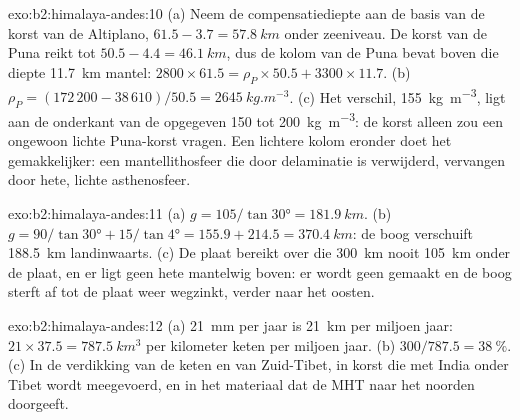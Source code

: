 \begin{solution}{exo:b2:himalaya-andes:10}
(a) Neem de compensatiediepte aan de basis van de korst van de Altiplano, $61.5 - 3.7 =
\qty{57.8}{km}$ onder zeeniveau. De korst van de Puna reikt tot $50.5 - 4.4 = \qty{46.1}{km}$, dus de
kolom van de Puna bevat boven die diepte \qty{11.7}{km} mantel: $2800\times61.5 =
\rho_P\times50.5 + 3300\times11.7$. (b) $\rho_P = (172\,200 - 38\,610)/50.5 =
\qty{2645}{kg.m^{-3}}$. (c) Het verschil, \qty{155}{kg.m^{-3}}, ligt aan de onderkant van
de opgegeven 150 tot \qty{200}{kg.m^{-3}}: de korst alleen zou een ongewoon lichte Puna-korst vragen.
Een lichtere kolom eronder doet het gemakkelijker: een mantellithosfeer die door delaminatie is verwijderd,
vervangen door hete, lichte asthenosfeer.
\end{solution}

\begin{solution}{exo:b2:himalaya-andes:11}
(a) $g = 105/\tan\ang{30} = \qty{181.9}{km}$. (b) $g = 90/\tan\ang{30} + 15/\tan\ang{4} =
155.9 + 214.5 = \qty{370.4}{km}$: de boog verschuift \qty{188.5}{km} landinwaarts. (c) De plaat bereikt
over die \qty{300}{km} nooit \qty{105}{km} onder de plaat, en er ligt geen hete mantelwig
boven: er wordt geen  gemaakt en de boog sterft af tot de plaat weer wegzinkt, verder naar het oosten.
\end{solution}

\begin{solution}{exo:b2:himalaya-andes:12}
(a) \qty{21}{mm} per jaar is \qty{21}{km} per miljoen jaar: $21\times37.5 =
\qty{787.5}{km^3}$ per kilometer keten per miljoen jaar. (b) $300/787.5 =
\qty{38}{\percent}$. (c) In de verdikking van de keten en van Zuid-Tibet, in korst die
met India onder Tibet wordt meegevoerd, en in het materiaal dat de MHT naar het noorden doorgeeft.
\end{solution}

